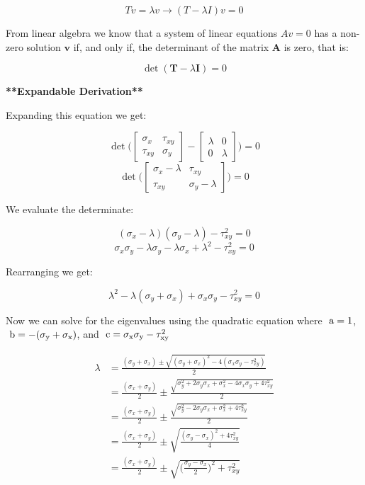 \[Tv = \lambda v \rightarrow (T-\lambda I)v = 0\]

\noindent From linear algebra we know that a system of linear equations $A v = 0$ has a non-zero solution $\boldsymbol{v}$ if, and only if, the determinant of the matrix $\boldsymbol{A}$ is zero, that is:

\[\det(\boldsymbol{T}-\lambda\boldsymbol{I})=0\]

\noindent \textbf{**Expandable Derivation**}

\noindent Expanding this equation we get:

\[\det\Biggl(\begin{bmatrix}
\sigma_{x} & \tau_{xy}\\
\tau_{xy} & \sigma_{y}
\end{bmatrix}
- \begin{bmatrix}
\lambda & 0\\
0 & \lambda
\end{bmatrix}
\Biggr) = 0
\]
\[\det\Biggl(\begin{bmatrix}
\sigma_{x}-\lambda & \tau_{xy}\\
\tau_{xy} & \sigma_{y}-\lambda
\end{bmatrix}
\Biggr) = 0
\]
                      
\noindent We evaluate the determinate:

\[(\sigma_{x}-\lambda)(\sigma_{y}-\lambda) - \tau_{xy}^2 = 0\]
\[\sigma_{x}\sigma_{y} - \lambda\sigma_{y} -\lambda\sigma_{x} + \lambda^2 - \tau_{xy}^2 = 0\]
                      
\noindent Rearranging we get:

\[\lambda^2 - \lambda(\sigma_{y} + \sigma_{x}) + \sigma_{x}\sigma_{y} - \tau_{xy}^2 = 0\]

\noindent Now we can solve for the eigenvalues using the quadratic equation where $\rm\ a = 1$, $\rm\ b = -(\sigma_{y} + \sigma_{x})$, and $\rm\ c = \sigma_{x}\sigma_{y} - \tau_{xy}^2$


\[\begin{align}
\lambda &= \frac{(\sigma_{y} + \sigma_{x}) \pm \sqrt{(\sigma_{y} + \sigma_{x})^2 - 4(\sigma_{x}\sigma_{y} - \tau_{xy}^2)}}{2} \\
&= \frac{(\sigma_{x} + \sigma_{y})}{2} \pm \frac{\sqrt{\sigma_{y}^2 + 2\sigma_{y}\sigma_{x} + \sigma_{x}^2 - 4\sigma_{x}\sigma_{y} + 4\tau_{xy}^2}}{2} \\
&= \frac{(\sigma_{x} + \sigma_{y})}{2} \pm \frac{\sqrt{\sigma_{y}^2 - 2\sigma_{y}\sigma_{x} + \sigma_{x}^2 + 4\tau_{xy}^2}}{2} \\
&= \frac{(\sigma_{x} + \sigma_{y})}{2} \pm \sqrt{\frac{(\sigma_{y} - \sigma_{x})^2 + 4\tau_{xy}^2}{4}} \\
&= \frac{(\sigma_{x} + \sigma_{y})}{2} \pm \sqrt{\biggl(\frac{\sigma_{y} - \sigma_{x}}{2}\biggr)^2 + \tau_{xy}^2}
\end{align}\]

